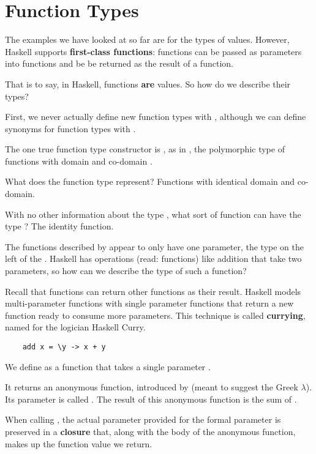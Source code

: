 \section{Function Types}

\begin{notelist}
    \item The examples we have looked at so far are for the types of values. However, Haskell supports
          \textbf{first-class functions}: functions can be passed as parameters into functions and be
          be returned as the result of a function.
    \item That is to say, in Haskell, functions \textbf{are} values. So how do we describe their types?
    \item First, we never actually define new function types with , although we can define
          synonyms for function types with .
    \item The one true function type constructor is \code{->}, as in , the polymorphic
          type of functions with domain  and co-domain .
    \begin{notelist}
        \item What does the function type  represent? Functions with identical domain and co-domain.
        \item With no other information about the type , what sort of function can have
              the type ? The identity function.
    \end{notelist}
    \item The functions described by \code{->} appear to only have one parameter, the type on the 
          left of the \code{->}. Haskell has operations (read: functions) like addition that take two parameters,
          so how can we describe the type of such a function?
    \item Recall that functions can return other functions as their result. Haskell models multi-parameter
          functions with single parameter functions that return a new function ready to consume more parameters.
          This technique is called \textbf{currying}, named for the logician Haskell Curry.
    \begin{lstlisting} 
    add x = \y -> x + y
    \end{lstlisting} 
    \begin{notelist}
        \item We define  as a function that takes a single parameter .
        \item It returns an anonymous function, introduced by \code{\\} (meant to suggest the Greek $\lambda$).
              Its parameter is called . The result of this anonymous function is the sum of . 
        \item When calling , the actual parameter provided for the formal parameter  is preserved
              in a \textbf{closure} that, along with the body of the anonymous function, makes up the
              function value we return.
    \end{notelist}
    

\end{notelist}
